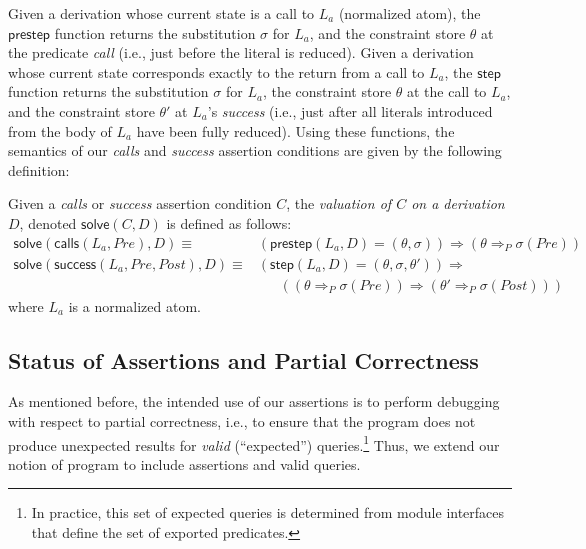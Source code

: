 \documentclass{llncs}
\newcommand{\callsAsr}[2]{\ensuremath{\textsf{calls}(#1, #2)}}
\newcommand{\successAsr}[3]{\ensuremath{\textsf{success}(#1, #2, #3)}}
\begin{document}
Given a derivation whose current state is a call to $L_a$ (normalized
atom), the $\textsf{prestep}$ function returns the substitution
$\sigma$ for $L_a$, and the constraint store $\theta$ at the
predicate \emph{call} (i.e., just before the literal is reduced).
Given a derivation whose current state corresponds exactly to the
return from a call to $L_a$, the $\textsf{step}$ function returns
the substitution $\sigma$ for $L_a$, the constraint store $\theta$
at the call to $L_a$, and the constraint store $\theta'$ at $L_a$'s
\emph{success} (i.e., just after all literals introduced from the
body of $L_a$ have been fully reduced).
Using these functions, the semantics of our \emph{calls} and
\emph{success} assertion conditions are given by the following
definition:

\begin{definition}
  \label{def:assrt-valuation}
  Given a \emph{calls} or \emph{success} assertion condition $C$, the
  \emph{valuation of $C$ on a derivation $D$}, denoted 
  $\textsf{solve}(C,D)$ is defined as follows: 
  \[
  \begin{array}{rl}
    \textsf{solve}(\callsAsr{L_a}{Pre},D)
    \equiv
    &
    \left( \textsf{prestep}(L_a,D)=(\theta,\sigma) \right) 
    \Rightarrow
    \left(\theta\Rightarrow_P\sigma(Pre)\right)
  \\
    \textsf{solve}(\successAsr{L_a}{Pre}{Post},D) \equiv
    &
    (\textsf{step}(L_a,D)=(\theta,\sigma,\theta'))
    \Rightarrow 
  \\
    &~~~~~~~
    ((\theta \Rightarrow_P \sigma(Pre))
    \Rightarrow
    (\theta' \Rightarrow_P \sigma(Post)))
  \end{array}
  \]
where $L_a$ is a normalized atom.
\end{definition}



\subsection{Status of Assertions and Partial Correctness}
\label{sec:asrt-status}

As mentioned before, the intended use of our assertions
is to perform debugging with respect to partial correctness, i.e.,
to ensure that the program does not produce unexpected results for
\emph{valid} (``expected'') queries.\footnote{In practice, this set
  of expected queries is determined from module interfaces that 
  define the set of exported predicates.}
Thus, we extend our notion of program to include assertions and valid
queries.
\end{document}
